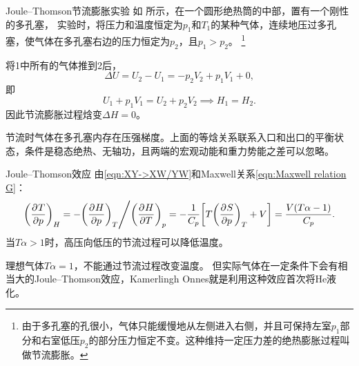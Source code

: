 \begin{example}
	{Joule--Thomson节流膨胀实验}{}
	如 所示，在一个圆形绝热筒的中部，置有一个刚性的多孔塞，
	实验时，将压力和温度恒定为$p_1$和$T_1$的某种气体，连续地压过多孔塞，使气体在多孔塞右边的压力恒定为$p_2$，且$p_1 > p_2$。
	\footnote{由于多孔塞的孔很小，气体只能缓慢地从左侧进入右侧，并且可保持左室$p_1$部分和右室低压$p_2$的部分压力恒定不变。这种维持一定压力差的绝热膨胀过程叫做节流膨胀。}
	\begin{notecaptionblock}
		\label{fig:Joule throttle expansion}
	\end{notecaptionblock}
	将1中所有的气体推到2后，
	\[
		\Delta U = U_2 - U_1 = -p_2V_2 + p_1V_1 + 0,
	\]
	即
	\begin{equation}
		\label{eq:sm-throttling-enthalpy}
		U_1 + p_1V_1 = U_2 + p_2V_2 \implies H_1 = H_2.
	\end{equation}
	因此节流膨胀过程焓变$\Delta H = 0$。
\end{example}

\begin{remark}
	节流时气体在多孔塞内存在压强梯度。上面的等焓关系联系入口和出口的平衡状态，条件是稳态绝热、无轴功，且两端的宏观动能和重力势能之差可以忽略。
\end{remark}

\begin{theorem}
	{Joule--Thomson效应}{}
	由\eqref{eqn:XY->XW/YW}和Maxwell关系\eqref{eqn:Maxwell relation G}：
	\begin{equation}
		\biggl(\frac{\partial^{}T}{\partial{p}^{}}\biggr)_{H} = -{\biggl(\frac{\partial^{}H}{\partial{p}^{}}\biggr)_{T}}\Bigg/{\biggl(\frac{\partial^{}H}{\partial{T}^{}}\biggr)_{p}} = -\frac1{C_p}\biggl[T\biggl(\frac{\partial^{}S}{\partial{p}^{}}\biggr)_{T} + V\biggr] = \frac{V(T\alpha - 1)}{C_p}.
	\end{equation}
	当$T\alpha > 1$时，高压向低压的节流过程可以降低温度。
\end{theorem}
\begin{remark}
	理想气体$T\alpha = 1$，不能通过节流过程改变温度。
	但实际气体在一定条件下会有相当大的Joule--Thomson效应，Kamerlingh Onnes就是利用这种效应首次将He液化。
\end{remark}

